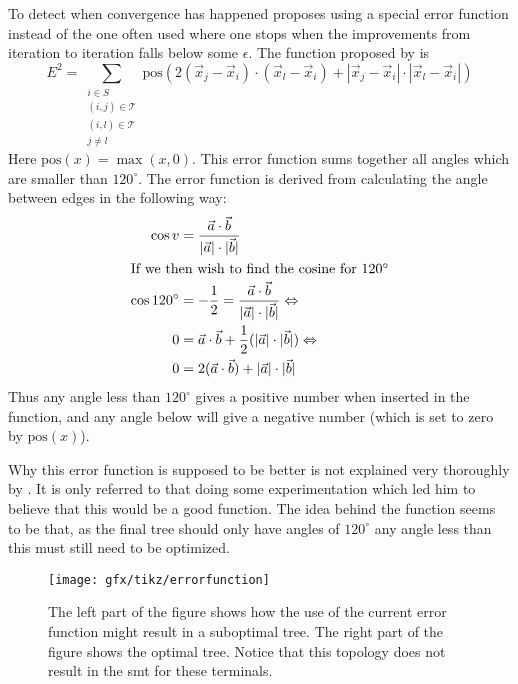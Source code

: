 To detect when convergence has happened \citeauthor{smith1992} proposes using a special
error function instead of the one often used where one stops when the
improvements from iteration to iteration falls below some $\epsilon$. The
function proposed by \citeauthor{smith1992} is
%
\begin{equation}
  E^2 = \sum_{
    \begin{array}{c} i \in S \\ (i,j) \in \mathcal{T} \\ (i,l) \in \mathcal{T} \\ j \ne l
    \end{array}} \text{pos} (2 (\vec x_j - \vec x_i) \cdot (\vec x_l - \vec x_i)
+ | \vec x_j - \vec x_i | \cdot | \vec x_l - \vec x_i |) \label{eq:28}
\end{equation}
%
Here $\text{pos}(x) = \max(x, 0)$. This error function sums together all angles which
are smaller than $120^{\circ}$. The error function is derived from calculating
the angle between edges in the following way:
%
\begin{align}
  \cos v & = \frac{\vec a \cdot \vec b}
    {|\vec a| \cdot |\vec b|}                 \\
  \intertext{If we then wish to find the cosine for $120^{\circ}$}
  \cos 120^{\circ}
         & = -\frac{1}{2} = \frac{\vec a \cdot \vec b}
    {|\vec a| \cdot |\vec b|} \Leftrightarrow \\
  0      & = \vec a \cdot \vec b + \frac{1}{2}
    (|\vec a| \cdot |\vec b|) \Leftrightarrow \\
  0      & = 2 (\vec a \cdot \vec b) + |\vec a| \cdot |\vec b|
\end{align}
%
Thus any angle less than $120^{\circ}$ gives a positive number when inserted in
the function, and any angle below will give a negative number (which is set to
zero by $\text{pos}(x)$).

Why this error function is supposed to be better is not explained very
thoroughly by \citeauthor{smith1992}. It is only referred to that doing some
experimentation which led him to believe that this would be a good function. The
idea behind the function seems to be that, as the final tree should only have
angles of $120^{\circ}$ any angle less than this must still need to be
optimized.

\begin{figure}[htbp]
  \centering
  \texttt{[image: gfx/tikz/errorfunction]}
  \caption[Possible problem with the error function, part 1]{The left part of the figure
    shows how the use of the current error function might result in a suboptimal
    tree. The right part of the figure shows the optimal tree. Notice that
    this topology does not result in the \ac{smt} for these
    terminals.\label{fig:error-function}}
\end{figure}


